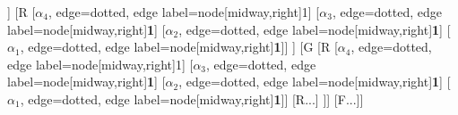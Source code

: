\begin{forest}
[B
	[F
		[G
			[R
				[$\alpha_{4}$, edge=dotted, edge label={node[midway,right]{1}}]
				[$\alpha_{3}$, edge=dotted, edge label={node[midway,right]{\textbf{1}}}]
				[$\alpha_{2}$, edge=dotted, edge label={node[midway,right]{\textbf{1}}}]
				[$\alpha_{1}$, edge=dotted, edge label={node[midway,right]{\textbf{1}}}]]
			[R
				[$\alpha_{4}$, edge=dotted, edge label={node[midway,right]{1}}]
				[$\alpha_{3}$, edge=dotted, edge label={node[midway,right]{\textbf{1}}}]
				[$\alpha_{2}$, edge=dotted, edge label={node[midway,right]{\textbf{1}}}]
				[$\alpha_{1}$, edge=dotted, edge label={node[midway,right]{\textbf{1}}}]]
		]
		[G
			[R
				[$\alpha_{4}$, edge=dotted, edge label={node[midway,right]{1}}]
				[$\alpha_{3}$, edge=dotted, edge label={node[midway,right]{\textbf{1}}}]
				[$\alpha_{2}$, edge=dotted, edge label={node[midway,right]{\textbf{1}}}]
				[$\alpha_{1}$, edge=dotted, edge label={node[midway,right]{\textbf{1}}}]]
			[R...]
		]]
	[F...]]
\end{forest}
